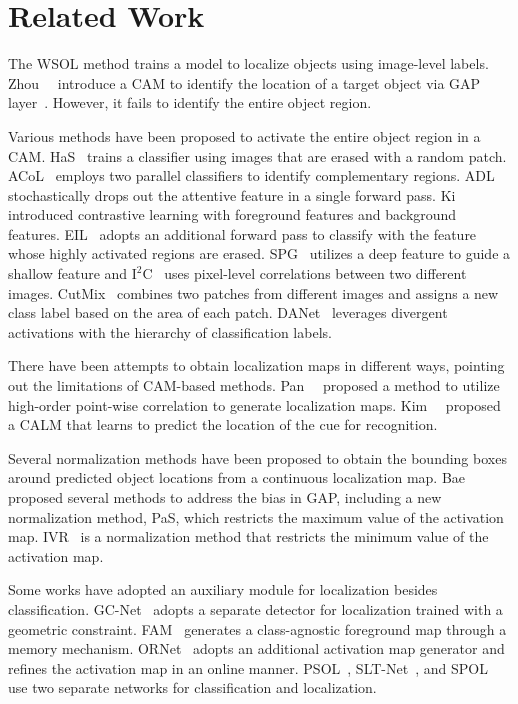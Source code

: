 \section{Related Work}
The WSOL method trains a model to localize objects using image-level labels. Zhou~\etal~\cite{zhou2016learning} introduce a CAM to identify the location of a target object via GAP layer~\cite{lin2013network}. However, it fails to identify the entire object region.

Various methods have been proposed to activate the entire object region in a CAM. HaS~\cite{singh2017hide} trains a classifier using images that are erased with a random patch. ACoL~\cite{zhang2018adversarial} employs two parallel classifiers to identify complementary regions. ADL~\cite{choe2019attention,choe2020attention} stochastically drops out the attentive feature in a single forward pass. Ki~\etal~\cite{ki2020sample} introduced contrastive learning with foreground features and background features. EIL~\cite{mai2020erasing} adopts an additional forward pass to classify with the feature whose highly activated regions are erased. SPG~\cite{zhang2018self} utilizes a deep feature to guide a shallow feature and $\text{I}^2\text{C}$~\cite{zhang2020inter} uses pixel-level correlations between two different images. CutMix~\cite{yun2019cutmix} combines two patches from different images and assigns a new class label based on the area of each patch. DANet~\cite{xue2019danet} leverages divergent activations with the hierarchy of classification labels.




There have been attempts to obtain localization maps in different ways, pointing out the limitations of CAM-based methods. Pan~\etal~\cite{pan2021unveiling} proposed a method to utilize high-order point-wise correlation to generate localization maps. Kim~\etal~\cite{kim2021keep} proposed a CALM that learns to predict the location of the cue for recognition.

Several normalization methods have been proposed to obtain the bounding boxes around predicted object locations from a continuous localization map. Bae~\etal~\cite{bae2020rethinking} proposed several methods to address the bias in GAP, including a new normalization method, PaS, which restricts the maximum value of the activation map. IVR~\cite{kim2021normalization} is a normalization method that restricts the minimum value of the activation map.

Some works have adopted an auxiliary module for localization besides classification. GC-Net~\cite{lu2020geometry} adopts a separate detector for localization trained with a geometric constraint. FAM~\cite{meng2021foreground} generates a class-agnostic foreground map through a memory mechanism. ORNet~\cite{xie2021online} adopts an additional activation map generator and refines the activation map in an online manner. PSOL~\cite{zhang2020rethinking}, SLT-Net~\cite{guo2021strengthen}, and SPOL~\cite{wei2021shallow} use two separate networks for classification and localization.

